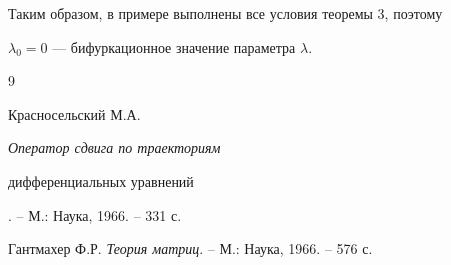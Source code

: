Таким образом, в примере выполнены все условия теоремы 3, поэтому 


$\lambda_0=0$ --- бифуркационное значение параметра $\lambda$. 


 


\begin{thebibliography}{9} 


 




Красносельский М.А. {\em Оператор сдвига по траекториям 


дифференциальных уравнений}. -- М.: Наука, 1966. -- 331 с. 




Гантмахер Ф.Р. {\em Теория матриц}. -- М.: Наука, 1966. -- 576 с. 


 


\end{thebibliography} 


 


\vskip 2cm 


 








 


\label{end} 


 


